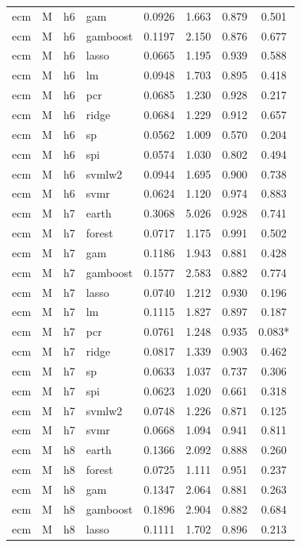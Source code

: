 \begin{ThreePartTable}
\begin{longtable}[t]{llclcccc}
ecm & M & h6 & gam & 0.0926 & 1.663 & 0.879 & 0.501\\
ecm & M & h6 & gamboost & 0.1197 & 2.150 & 0.876 & 0.677\\
ecm & M & h6 & lasso & 0.0665 & 1.195 & 0.939 & 0.588\\
ecm & M & h6 & lm & 0.0948 & 1.703 & 0.895 & 0.418\\
ecm & M & h6 & pcr & 0.0685 & 1.230 & 0.928 & 0.217\\
ecm & M & h6 & ridge & 0.0684 & 1.229 & 0.912 & 0.657\\
ecm & M & h6 & sp & 0.0562 & 1.009 & 0.570 & 0.204\\
ecm & M & h6 & spi & 0.0574 & 1.030 & 0.802 & 0.494\\
ecm & M & h6 & svmlw2 & 0.0944 & 1.695 & 0.900 & 0.738\\
ecm & M & h6 & svmr & 0.0624 & 1.120 & 0.974 & 0.883\\
\addlinespace
ecm & M & h7 & earth & 0.3068 & 5.026 & 0.928 & 0.741\\
ecm & M & h7 & forest & 0.0717 & 1.175 & 0.991 & 0.502\\
ecm & M & h7 & gam & 0.1186 & 1.943 & 0.881 & 0.428\\
ecm & M & h7 & gamboost & 0.1577 & 2.583 & 0.882 & 0.774\\
ecm & M & h7 & lasso & 0.0740 & 1.212 & 0.930 & 0.196\\
ecm & M & h7 & lm & 0.1115 & 1.827 & 0.897 & 0.187\\
ecm & M & h7 & pcr & 0.0761 & 1.248 & 0.935 & 0.083*\\
ecm & M & h7 & ridge & 0.0817 & 1.339 & 0.903 & 0.462\\
ecm & M & h7 & sp & 0.0633 & 1.037 & 0.737 & 0.306\\
ecm & M & h7 & spi & 0.0623 & 1.020 & 0.661 & 0.318\\
ecm & M & h7 & svmlw2 & 0.0748 & 1.226 & 0.871 & 0.125\\
ecm & M & h7 & svmr & 0.0668 & 1.094 & 0.941 & 0.811\\
\addlinespace
ecm & M & h8 & earth & 0.1366 & 2.092 & 0.888 & 0.260\\
ecm & M & h8 & forest & 0.0725 & 1.111 & 0.951 & 0.237\\
ecm & M & h8 & gam & 0.1347 & 2.064 & 0.881 & 0.263\\
ecm & M & h8 & gamboost & 0.1896 & 2.904 & 0.882 & 0.684\\
ecm & M & h8 & lasso & 0.1111 & 1.702 & 0.896 & 0.213\\

\end{longtable}
\end{ThreePartTable}
